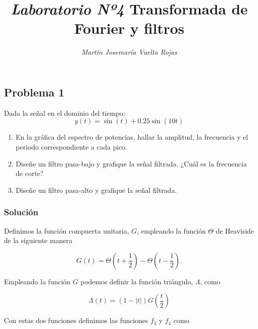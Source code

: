 \documentclass[a4paper,12pt,final]{article}
\begin{document}
  \title{\textit{\Large Laboratorio Nº4}\linebreak{}\linebreak{}
  \textbf{\Huge Transformada de Fourier y filtros}}
  \author{\emph{Martín Josemaría Vuelta Rojas}}
  \maketitle

  \subsection*{Problema 1}
    \noindent Dada la señal en el dominio del tiempo:
      $$y\left(t\right) = \sin\left(t\right) + 0.25\sin\left(10t\right)$$

      \begin{enumerate}[label=\alph*)]
        \item En la gráfica del espectro de potencias, hallar la amplitud,
              la frecuencia y el periodo correspondiente a cada pico.
        \item Diseñe un filtro pasa-bajo y grafique la señal filtrada.
              ¿Cuál es la frecuencia de corte?
        \item Diseñe un filtro pasa-alto y grafique la señal filtrada.
      \end{enumerate}

    \subsubsection*{Solución}

      \noindent Definimos la función compuerta unitaria, $G$, empleando la función
      $\Theta$ de Heaviside de la siguiente manera

      \begin{equation*}
         G\left(t\right) = \Theta\left(t + \frac{1}{2}\right) -
                           \Theta\left(t - \frac{1}{2}\right).
      \end{equation*}

      \noindent Empleando la función $G$ podemos definir la función triángulo,
      $\Lambda$, como

      \begin{equation*}
         \Lambda\left(t\right) = \left(1 - \left|t\right|\right)G\left(\frac{t}{2}\right)
      \end{equation*}

      \noindent Con estas dos funciones definimos las funciones $f_3$ y $f_4$
      como
\end{document}
